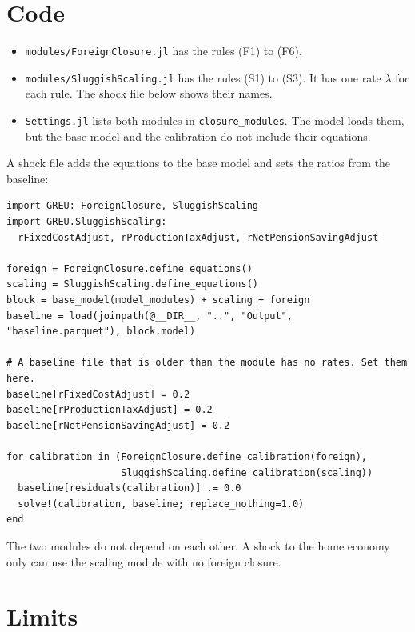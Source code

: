 \documentclass[11pt,a4paper]{article}
\newcommand{\code}[1]{\texttt{#1}}
\begin{document}
\section{Code}

\begin{itemize}
\item \code{modules/ForeignClosure.jl} has the rules (F1) to (F6).
\item \code{modules/SluggishScaling.jl} has the rules (S1) to (S3). It has one rate $\lambda$ for each rule. The shock file below shows their names.
\item \code{Settings.jl} lists both modules in \code{closure\_modules}. The model loads them, but the base model and the calibration do not include their equations.
\end{itemize}

A shock file adds the equations to the base model and sets the ratios from the baseline:

{\small
\begin{verbatim}
import GREU: ForeignClosure, SluggishScaling
import GREU.SluggishScaling:
  rFixedCostAdjust, rProductionTaxAdjust, rNetPensionSavingAdjust

foreign = ForeignClosure.define_equations()
scaling = SluggishScaling.define_equations()
block = base_model(model_modules) + scaling + foreign
baseline = load(joinpath(@__DIR__, "..", "Output", "baseline.parquet"), block.model)

# A baseline file that is older than the module has no rates. Set them here.
baseline[rFixedCostAdjust] = 0.2
baseline[rProductionTaxAdjust] = 0.2
baseline[rNetPensionSavingAdjust] = 0.2

for calibration in (ForeignClosure.define_calibration(foreign),
                    SluggishScaling.define_calibration(scaling))
  baseline[residuals(calibration)] .= 0.0
  solve!(calibration, baseline; replace_nothing=1.0)
end
\end{verbatim}
}

The two modules do not depend on each other. A shock to the home economy only can use the scaling module with no foreign closure.

\section{Limits}
\end{document}
